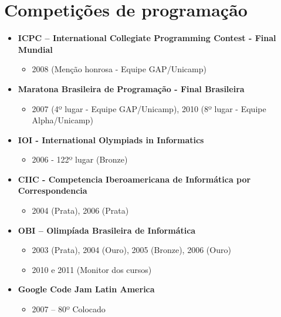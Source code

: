 \documentclass[a4paper,10pt]{article}
\begin{document}
  \section{Competições de programação}
    \begin{itemize}
      \item 
        \textbf{ICPC – International Collegiate Programming Contest - Final Mundial}
        \begin{itemize}
          \item 2008 (Menção honrosa - Equipe GAP/Unicamp)
        \end{itemize}
      \item 
        \textbf{Maratona Brasileira de Programação - Final Brasileira}
        \begin{itemize}
          \item 2007 (4º lugar - Equipe GAP/Unicamp), 2010 (8º lugar - Equipe Alpha/Unicamp)
        \end{itemize}
      \item 
        \textbf{IOI - International Olympiads in Informatics}
        \begin{itemize}
          \item 2006 - 122º lugar (Bronze)
        \end{itemize}
      \item 
        \textbf{CIIC - Competencia Iberoamericana de Informática por Correspondencia}
        \begin{itemize}
          \item 2004 (Prata), 2006 (Prata)
        \end{itemize}
      \item 
        \textbf{OBI – Olimpíada Brasileira de Informática}
        \begin{itemize}
          \item 2003 (Prata), 2004 (Ouro), 2005 (Bronze), 2006 (Ouro)
          \item 2010 e 2011 (Monitor dos cursos)
        \end{itemize}
      \item 
        \textbf{Google Code Jam Latin America}
        \begin{itemize}
          \item 2007 – 80º Colocado
        \end{itemize}
    \end{itemize}
\end{document}
